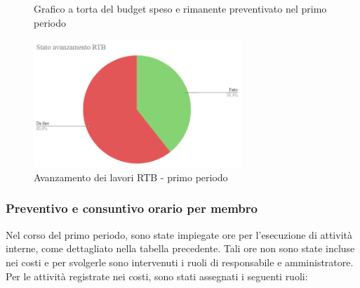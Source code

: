 \begin{figure}[ht]
    \centering
    \begin{minipage}[b]{0.45\textwidth}
        \centering
        \caption{Grafico a torta del budget speso e rimanente preventivato nel primo periodo}
        \label{fig:GraficoTorta}
    \end{minipage}
    
    \vspace{1cm}

    \begin{minipage}[b]{0.70\textwidth}
        \centering
        \includegraphics[width=0.7\textwidth]{../Images/avanzamento1Periodo.png}
        \caption{Avanzamento dei lavori RTB - primo periodo}
        \label{fig:AvRtb1}
    \end{minipage}
\end{figure}

\subsubsection*{Preventivo e consuntivo orario per membro}
Nel corso del primo periodo, sono state impiegate ore per l'esecuzione di attività interne, come dettagliato nella tabella precedente. Tali ore non sono state incluse nei costi e per svolgerle sono intervenuti i ruoli di responsabile e amministratore.
Per le attività registrate nei costi, sono stati assegnati i seguenti ruoli:

